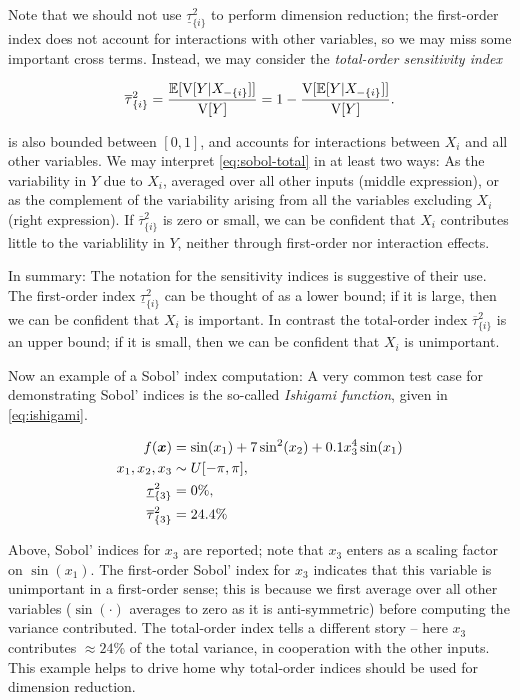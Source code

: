\documentclass{article}
\begin{document}
Note that we should not use \(\underline{\tau}_{\{i\}}^2\) to perform dimension
reduction; the first-order index does not account for interactions with other
variables, so we may miss some important cross terms. Instead, we may consider
the \emph{total-order sensitivity index}

\begin{equation}\label{eq:sobol-total}
  \overline{\tau}_{\{i\}}^2 = \frac{\E[\V[Y|X_{-\{i\}}]]}{\V[Y]} = %
  1 - \frac{\V[\E[Y|X_{-\{i\}}]]}{\V[Y]}.
\end{equation}

\noindent {} is also bounded between \([0,1]\), and accounts
for interactions between \(X_i\) and all other variables. We may interpret
\eqref{eq:sobol-total} in at least two ways: As the variability in \(Y\) due to
\(X_i\), averaged over all other inputs (middle expression), or as the complement
of the variability arising from all the variables excluding \(X_i\) (right
expression). If \(\overline{\tau}_{\{i\}}^2\) is zero or small, we can be
confident that \(X_i\) contributes little to the variablility in \(Y\), neither
through first-order nor interaction effects.

In summary: The notation for the sensitivity indices is suggestive of their use.
The first-order index \(\underline{\tau}_{\{i\}}^2\) can be thought of as a
lower bound; if it is large, then we can be confident that \(X_i\) is important.
In contrast the total-order index \(\overline{\tau}_{\{i\}}^2\) is an upper
bound; if it is small, then we can be confident that \(X_i\) is unimportant.

Now an example of a Sobol' index computation: A very common test case for
demonstrating Sobol' indices is the so-called \emph{Ishigami
  function},\cite{ishigami1990importance} given in \eqref{eq:ishigami}.

\begin{equation*} \begin{aligned} \label{eq:ishigami}
  f(\boldsymbol{x}) &= \sin(x_1) + 7\sin^2(x_2) + 0.1 x_3^4\sin(x_1) \\
  x_1, x_2, x_3 &\sim U[-\pi, \pi], \\
  \underline{\tau}_{\{3\}}^2 &= 0\%, \\
  \overline{\tau}_{\{3\}}^2 &= 24.4\%
\end{aligned} \end{equation*}

\noindent Above, Sobol' indices for $x_3$ are reported; note that $x_3$ enters
as a scaling factor on $\sin(x_1)$. The first-order Sobol' index for $x_3$
indicates that this variable is unimportant in a first-order sense; this is
because we first average over all other variables ($\sin(\cdot)$ averages to
zero as it is anti-symmetric) before computing the variance contributed. The
total-order index tells a different story -- here $x_3$ contributes
$\approx24\%$ of the total variance, in cooperation with the other inputs. This
example helps to drive home why total-order indices should be used for dimension
reduction.
\end{document}
